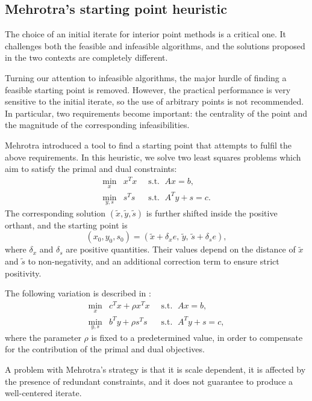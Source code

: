 \subsection{Mehrotra's starting point heuristic}
\label{sec:StartingPoint}

The choice of an initial iterate for interior point methods is a
critical one. It challenges both the feasible and infeasible
algorithms, and the solutions proposed in the two contexts are
completely different.

Turning our attention to infeasible algorithms, the major hurdle
of finding a feasible starting point is removed. 
However, the practical performance is very sensitive to the initial
iterate, so the use of arbitrary points is not recommended.
In particular, two requirements become important: the centrality 
of the point and the magnitude of the corresponding infeasibilities.

Mehrotra \cite{Mehrotra92} introduced a tool to find a starting point 
that attempts to fulfil the above requirements. In this
heuristic, we solve two least squares problems which aim to
satisfy the primal and dual constraints:
\begin{eqnarray*}
  \min_x    \!\! & x^Tx & \;\;\mbox{s.t. }\; Ax = b,      \\
  \min_{y,s}\!\! & s^Ts & \;\;\mbox{s.t. }\; A^Ty + s = c.
\end{eqnarray*}
The corresponding solution $(\tilde x, \tilde y, \tilde s)$ is further 
shifted inside the positive orthant, and the starting point is
\[
(x_0,y_0,s_0) = (\tilde x + \delta_x e,\, \tilde y,\, \tilde s + \delta_s e),
\]
where $\delta_x$ and $\delta_s$ are positive quantities. 
Their values depend on the distance of $\tilde x$ and $\tilde s$
to non-negativity, and an additional correction term to ensure
strict positivity.

The following variation is described in \cite{GondzioTerlaky}:
\begin{eqnarray*} 
  \min_x    \!\! & c^Tx + \rho x^Tx & \;\;\mbox{s.t. }\; Ax = b,      \\
  \min_{y,s}\!\! & b^Ty + \rho s^Ts & \;\;\mbox{s.t. }\; A^Ty + s = c,
\end{eqnarray*}
where the parameter $\rho$ is fixed to a predetermined value, in order
to compensate for the contribution of the primal and dual objectives.

A problem with Mehrotra's strategy is that it is scale dependent,
it is affected by the presence of redundant constraints,
and it does not guarantee to produce a well-centered iterate.

